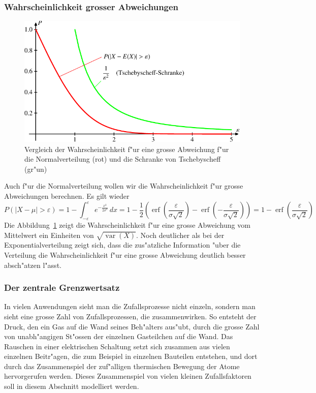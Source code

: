 \subsubsection{Wahrscheinlichkeit grosser Abweichungen}
\begin{figure}
\begin{center}
\includegraphics{images/norm-1.pdf}
\end{center}
\caption{Vergleich der Wahrscheinlichkeit f"ur eine grosse Abweichung
f"ur die Normalverteilung (rot) und die Schranke von Tschebyscheff (gr"un)
\label{abweichung-normalverteilung}}
\end{figure}

Auch f"ur die Normalverteilung wollen wir die Wahrscheinlichkeit
f"ur grosse Abweichungen berechnen.
Es gilt wieder
\[
P(|X-\mu|>\varepsilon)
=1-\int_{-\varepsilon}^{\varepsilon}e^{-\frac{x^2}{2\sigma^2}}\,dx
=
1-{\textstyle\frac12}(\operatorname{erf}({\textstyle\frac{\varepsilon}{\sigma\sqrt{2}}})-\operatorname{erf}({\textstyle-\frac{\varepsilon}{\sigma\sqrt{2}}}))
=
1-\operatorname{erf}({\textstyle\frac{\varepsilon}{\sigma\sqrt{2}}})
\]
Die Abbildung~\ref{abweichung-normalverteilung} zeigt die Wahrscheinlichkeit
f"ur eine grosse Abweichung vom Mittelwert ein Einheiten
von $\sqrt{\operatorname{var}(X)}$.
Noch deutlicher als bei der
Exponentialverteilung zeigt sich, dass die zus"atzliche Information
"uber die Verteilung die Wahrscheinlichkeit f"ur eine grosse
Abweichung deutlich besser absch"atzen l"asst.

\subsubsection{Der zentrale Grenzwertsatz}
\label{zentraler-grenzwertsatz}
In vielen Anwendungen sieht man die Zufallsprozesse nicht einzeln, sondern
man sieht eine grosse Zahl von Zufallsprozessen, die zusammenwirken.
So entsteht der Druck, den ein Gas auf die Wand seines Beh"alters aus"ubt,
durch die grosse Zahl von unabh"angigen St"ossen der einzelnen Gasteilchen
auf die Wand.
Das Rauschen in einer elektrischen Schaltung setzt sich
zusammen aus vielen einzelnen Beitr"agen, die zum Beispiel in einzelnen
Bauteilen entstehen, und dort durch das Zusammenspiel der zuf"alligen
thermischen Bewegung der Atome hervorgerufen werden.
Dieses Zusammenspiel von vielen kleinen Zufallsfaktoren soll in diesem
Abschnitt modelliert werden.

